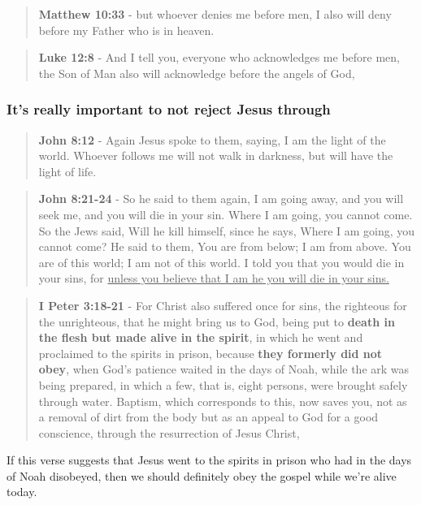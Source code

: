 \documentclass[11pt]{article}
\begin{document}
\begin{quote}
\textbf{Matthew 10:33} - but whoever denies me before men, I also will deny before my Father who is in heaven.
\end{quote}

\begin{quote}
\textbf{Luke 12:8} - And I tell you, everyone who acknowledges me before men, the Son of Man also will acknowledge before the angels of God,
\end{quote}

\subsubsection{It's \textbf{really} important to not reject Jesus through}
\label{sec:orga296ccf}
\begin{quote}
\textbf{John 8:12} - Again Jesus spoke to them, saying, I am the light of the world. Whoever follows me will not walk in darkness, but will have the light of life.
\end{quote}

\begin{quote}
\textbf{John 8:21-24} - So he said to them again, I am going away, and you will seek me, and you will die in your sin. Where I am going, you cannot come. So the Jews said, Will he kill himself, since he says, Where I am going, you cannot come? He said to them, You are from below; I am from above. You are of this world; I am not of this world. I told you that you would die in your sins, for \uline{unless you believe that I am he you will die in your sins.}
\end{quote}

\begin{quote}
\textbf{I Peter 3:18-21} - For Christ also suffered once for sins, the righteous for the unrighteous, that he might bring us to God, being put to \textbf{death in the flesh but made alive in the spirit}, in which he went and proclaimed to the spirits in prison, because \textbf{they formerly did not obey}, when God's patience waited in the days of Noah, while the ark was being prepared, in which a few, that is, eight persons, were brought safely through water. Baptism, which corresponds to this, now saves you, not as a removal of dirt from the body but as an appeal to God for a good conscience, through the resurrection of Jesus Christ,
\end{quote}

If this verse suggests that Jesus went to the spirits in prison who had in the days of Noah disobeyed, then we should definitely obey the gospel while we're alive today.
\end{document}
